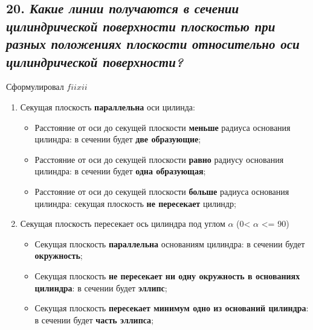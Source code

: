 
\newpage
\subsection*{20. \textit{Какие линии получаются в сечении цилиндрической поверхности плоскостью при разных положениях плоскости относительно оси цилиндрической поверхности?}}

\begin{mainQuote}
    \centering Сформулировал $fiixii$
\end{mainQuote}

\begin{enumerate}
    \item Секущая плоскость {\bf параллельна} оси цилинда:
    \begin{itemize}
        
        \item Расстояние от оси до секущей плоскости {\bf меньше} радиуса основания цилиндра: в сечении будет {\bf две образующие};

        \item Расстояние от оси до секущей плоскости {\bf равно} радиусу основания цилиндра: в сечении будет {\bf одна образующая}; 

        \item Расстояние от оси до секущей плоскости {\bf больше} радиуса основания цилиндра: секущая плоскость {\bf не пересекает} цилиндр;

    \end{itemize}
    \item Секущая плоскость пересекает ось цилиндра под углом $\alpha$ (0\textdegree < $\alpha$ <= 90\textdegree)
    \begin {itemize}

        \item Секущая плоскость {\bf параллельна} основаниям цилиндра: в сечении будет {\bf окружность};

        \item Секущая плоскость {\bf не пересекает ни одну окружность в основаниях цилиндра}: в сечении будет {\bf эллипс};

        \item Секущая плоскость {\bf пересекает минимум одно из оснований цилиндра}: в сечении будет {\bf часть эллипса};

    \end{itemize}
    
\end{enumerate}

